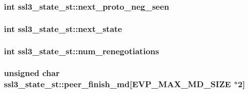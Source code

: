 \subsubsection[{\texorpdfstring{next\+\_\+proto\+\_\+neg\+\_\+seen}{next_proto_neg_seen}}]{\setlength{\rightskip}{0pt plus 5cm}int ssl3\+\_\+state\+\_\+st\+::next\+\_\+proto\+\_\+neg\+\_\+seen}\hypertarget{structssl3__state__st_a4adab3030a0253c611ca6c03c19f63c6}{}\label{structssl3__state__st_a4adab3030a0253c611ca6c03c19f63c6}
\subsubsection[{\texorpdfstring{next\+\_\+state}{next_state}}]{\setlength{\rightskip}{0pt plus 5cm}int ssl3\+\_\+state\+\_\+st\+::next\+\_\+state}\hypertarget{structssl3__state__st_a89566d98bd0927ed27885e99a83f6f8b}{}\label{structssl3__state__st_a89566d98bd0927ed27885e99a83f6f8b}
\subsubsection[{\texorpdfstring{num\+\_\+renegotiations}{num_renegotiations}}]{\setlength{\rightskip}{0pt plus 5cm}int ssl3\+\_\+state\+\_\+st\+::num\+\_\+renegotiations}\hypertarget{structssl3__state__st_a29127aad172c73e45a03e42a9e42efde}{}\label{structssl3__state__st_a29127aad172c73e45a03e42a9e42efde}
\subsubsection[{\texorpdfstring{peer\+\_\+finish\+\_\+md}{peer_finish_md}}]{\setlength{\rightskip}{0pt plus 5cm}unsigned char ssl3\+\_\+state\+\_\+st\+::peer\+\_\+finish\+\_\+md\mbox{[}{\bf E\+V\+P\+\_\+\+M\+A\+X\+\_\+\+M\+D\+\_\+\+S\+I\+ZE} $\ast$2\mbox{]}}\hypertarget{structssl3__state__st_a820e7e25cf89b3b656234f187e6b40c3}{}\label{structssl3__state__st_a820e7e25cf89b3b656234f187e6b40c3}
